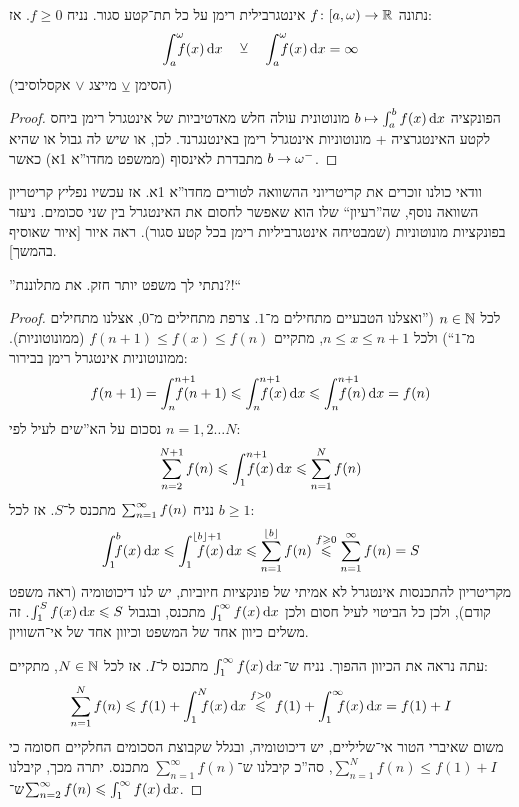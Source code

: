 \documentclass[name=רשימות חדו''א 2א]{../../../tex/classes/noChapterMegasumPreamble}
\newcommand\Is{\dequad \ }
\newcommand\hopen {[a, \wg)}
\begin{document}
	\begin{Theorem}
		נתונה $f \co \hopen \to \R$ אינטגרבילית רימן על כל תת־קטע סגור. נניח $f \ge 0$. אז:
		\[ \int^{\wg}_a \Is f(x)\dx \quad \veebar \quad \int^{\wg}_a \Is f(x)\dx = \infty \]
		(הסימן $\veebar$ מייצג $\lor$ אקסלוסיבי)
	\end{Theorem}
	\begin{proof}
		הפונקציה $b \mapsto \int^{b}_a f(x)\,\mathrm{d}x$ מונוטונית עולה חלש מאדטיביות של אינטגרל רימן ביחס לקטע האינטגרציה + מונוטוניות אינטגרל רימן באינטנגרנד. לכן, או שיש לה גבול או שהיא מתבדרת לאינסוף (ממשפט מחדו''א 1א) כאשר $b \to \omega^{-}$.
	\end{proof}

	וודאי כולנו זוכרים את קריטריוני ההשוואה לטורים מחדו''א 1א. אז עכשיו נפליץ קריטריון השוואה נוסף, שה''רעיון`` שלו הוא שאפשר לחסום את האינטגרל בין שני סכומים. ניעזר בפונקציות מונוטוניות (שמבטיחה אינטגרביליות רימן בכל קטע סגור). ראה איור [איור שאוסיף בהמשך].

	\clm{נתונה $f \co [1, \infty) \to \R$.
	\begin{itemize}
		\item נניח $f$ יורדת במובן החלש ו־$f > 0$. אז האינטגרל הלא אמיתי $\int^{\infty}_1 f(x)\dx$ מתכנס אמ''מ הטור $\sumninf f(n)$ מתכנס. ואם תנאים אלו מתקיימים, אז $\sum_{n = 2}^{\infty}f(n) \le \int^{\infty}_1 f(x) \dx \le \sumninf f(n)$.
	\end{itemize}}
	''נתתי לך משפט יותר חזק. את מתלוננת?!``
	\begin{proof}
		לכל $n \in \mathbb{N}$ (''ואצלנו הטבעיים מתחילים מ־$1$. צרפת מתחילים מ־$0$, אצלנו מתחילים מ־$1$``) ולכל $n \le x \le n + 1$, מתקיים $f(n + 1) \le f(x) \le f(n)$ (ממונוטוניות). ממונוטוניות אינטגרל רימן בבירור:
		\[ f(n + 1) = \int^{n + 1}_n\dequad\Is f(n + 1) \le \int^{n + 1}_n \dequad \Is f(x)\dx \le \int^{n + 1}_n\dequad\Is f(n)\dx = f(n) \]
		נסכום על הא''שים לעיל לפי $n = 1, 2 \dots N$:
		\[ \sum^{N + 1}_{n = 2}f(n) \le \int^{n + 1}_1\dequad\Is f(x)\dx \le \sum^{N}_{n = 1}f(n) \]
		נניח $\sumninf f(n)$ מתכנס ל־$S$. אז לכל $b\ge 1$:
		\[ \int^{b}_1 \Is f(x)\dx \le \int^{\floor{b} + 1}_1 \dequad\dequad f(x)\dx \le \sum_{n = 1}^{\floor{b}} f(n) \overset{f \ge 0}{ \le }\sum_{n = 1}^{\infty} f(n) = S \]
		מקריטריון להתכנסות אינטגרל לא אמיתי של פונקציות חיוביות, יש לנו דיכוטומיה (ראה משפט קודם), ולכן כל הביטוי לעיל חסום ולכן $\int^{\infty}_1 f(x) \dx$ מתכנס, ובגבול $\int^{S}_1 f(x)\,\mathrm{d}x \leqslant S$. זה משלים כיוון אחד של המשפט וכיוון אחד של אי־השוויון.

		עתה נראה את הכיוון ההפוך. נניח ש־$\int^{\infty}_1 f(x)\dx$ מתכנס ל־$I$. אז לכל $N \in \mathbb{N}$, מתקיים:
		\[ \sum_{n = 1}^{N}f(n) \le f(1) + \int^{N}_1 \Is f(x)\dx \overset{f > 0}{\le} f(1) + \int^{\infty}_1 \Is f(x)\dx  = f(1) + I \]
		משום שאיברי הטור אי־שליליים, יש דיכוטומיה, ובגלל שקבוצת הסכומים החלקיים חסומה כי $\sum_{n = 1}^{N} f(n) \le f(1) + I$, סה''כ קיבלנו ש־$\sum_{n = 1}^{\infty}f(n)$ מתכנס. יתרה מכך, קיבלנו ש־$\sum_{n = 2}^{\infty} f(n) \leqslant \int^{\infty}_1 f(x)\,\mathrm{d}x$.
	\end{proof}
\end{document}
